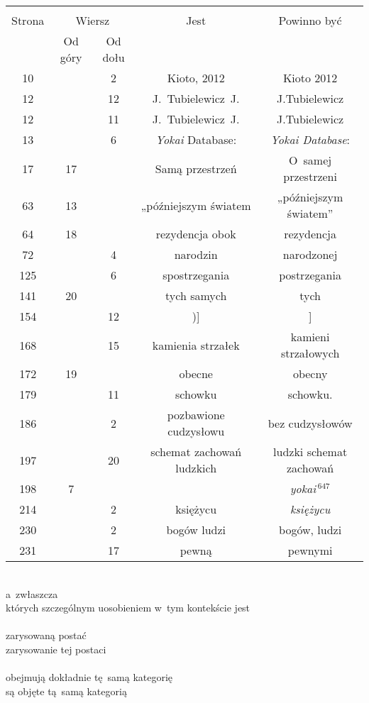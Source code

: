 \documentclass[a4paper,11pt]{article}
\begin{document}
\begin{center}

  \begin{tabular}{|c|c|c|c|c|}
    \hline
    & \multicolumn{2}{c|}{} & & \\
    Strona & \multicolumn{2}{c|}{Wiersz} & Jest
                              & Powinno być \\ \cline{2-3}
    & Od góry & Od dołu & & \\
    \hline
    10  & &  2 & Kioto, 2012 & Kioto 2012 \\
    12  & & 12 & J.~Tubielewicz~J. & J.Tubielewicz \\
    12  & & 11 & J.~Tubielewicz~J. & J.Tubielewicz \\
    13  & &  6 & \textit{Yokai} Database: & \textit{Yokai Database}: \\
    17  & 17 & & Samą przestrzeń & O~samej przestrzeni \\
    63  & 13 & & „późniejszym światem & „późniejszym światem” \\
    64  & 18 & & rezydencja obok & rezydencja \\
    72  & &  4 & narodzin & narodzonej \\
    125 & &  6 & spostrzegania & postrzegania \\
    141 & 20 & & tych samych & tych \\
    154 & & 12 & )] & ] \\
    168 & & 15 & kamienia strzałek & kamieni strzałowych \\
    172 & 19 & & obecne & obecny \\
    179 & & 11 & schowku & schowku. \\
    186 & &  2 & pozbawione cudzysłowu & bez cudzysłowów \\
    197 & & 20 & schemat zachowań ludzkich & ludzki schemat zachowań \\
    198 &  7 & & & \textit{yokai$\,^{647}$} \\  %
    214 & &  2 & księżycu & \textit{księżycu} \\
    230 & &  2 & bogów ludzi & bogów, ludzi \\
    231 & & 17 & pewną & pewnymi \\
    \hline
  \end{tabular}

\end{center}


\noindent
{} \\
\Jest  a~zwłaszcza \\
\Powin których szczególnym uosobieniem w~tym kontekście jest \\
 \\
\Jest  zarysowaną postać \\
\Powin zarysowanie tej postaci \\
 \\
\Jest  obejmują dokładnie tę~samą kategorię \\
\Powin są objęte tą~samą kategorią \\
\end{document}
